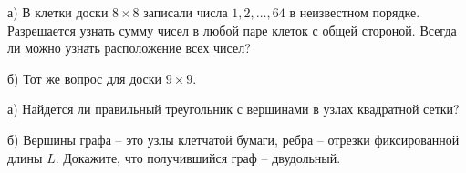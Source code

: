 \documentclass{article}
\begin{document}
\begin{enumerate_boxed}
        \item а) В клетки доски $8 \times 8$ записали числа $1, 2, \dotsc , 64$ в неизвестном порядке.
        Разрешается узнать сумму чисел в любой паре клеток с общей стороной.
        Всегда ли можно узнать расположение всех чисел?

        б) Тот же вопрос для доски $9 \times 9$.

        \item а) Найдется ли правильный треугольник с вершинами в узлах квадратной сетки?

        б) Вершины графа – это узлы клетчатой бумаги, ребра – отрезки фиксированной длины $L$.
        Докажите, что получившийся граф – двудольный.

    \end{enumerate_boxed}
\end{document}
